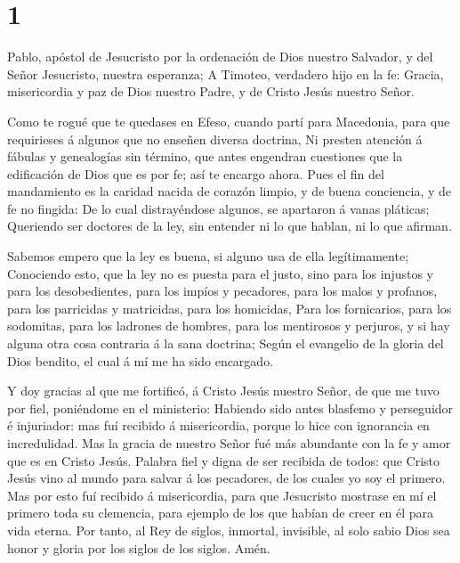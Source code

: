 \hypertarget{section}{%
\section{1}\label{section}}

 Pablo, apóstol de Jesucristo por la ordenación de Dios
nuestro Salvador, y del Señor Jesucristo, nuestra esperanza;
 A Timoteo, verdadero hijo en la fe: Gracia, misericordia y
paz de Dios nuestro Padre, y de Cristo Jesús nuestro Señor.

 Como te rogué que te quedases en Efeso, cuando partí para
Macedonia, para que requirieses á algunos que no enseñen diversa
doctrina,  Ni presten atención á fábulas y genealogías sin
término, que antes engendran cuestiones que la edificación de Dios que
es por fe; así te encargo ahora.  Pues el fin del
mandamiento es la caridad nacida de corazón limpio, y de buena
conciencia, y de fe no fingida:  De lo cual distrayéndose
algunos, se apartaron á vanas pláticas;  Queriendo ser
doctores de la ley, sin entender ni lo que hablan, ni lo que afirman.

 Sabemos empero que la ley es buena, si alguno usa de ella
legítimamente;  Conociendo esto, que la ley no es puesta
para el justo, sino para los injustos y para los desobedientes, para los
impíos y pecadores, para los malos y profanos, para los parricidas y
matricidas, para los homicidas,  Para los fornicarios, para
los sodomitas, para los ladrones de hombres, para los mentirosos y
perjuros, y si hay alguna otra cosa contraria á la sana doctrina;
 Según el evangelio de la gloria del Dios bendito, el cual
á mí me ha sido encargado.

 Y doy gracias al que me fortificó, á Cristo Jesús nuestro
Señor, de que me tuvo por fiel, poniéndome en el ministerio:
 Habiendo sido antes blasfemo y perseguidor é injuriador:
mas fuí recibido á misericordia, porque lo hice con ignorancia en
incredulidad.  Mas la gracia de nuestro Señor fué más
abundante con la fe y amor que es en Cristo Jesús.  Palabra
fiel y digna de ser recibida de todos: que Cristo Jesús vino al mundo
para salvar á los pecadores, de los cuales yo soy el primero.
 Mas por esto fuí recibido á misericordia, para que
Jesucristo mostrase en mí el primero toda su clemencia, para ejemplo de
los que habían de creer en él para vida eterna.  Por tanto,
al Rey de siglos, inmortal, invisible, al solo sabio Dios sea honor y
gloria por los siglos de los siglos. Amén.

